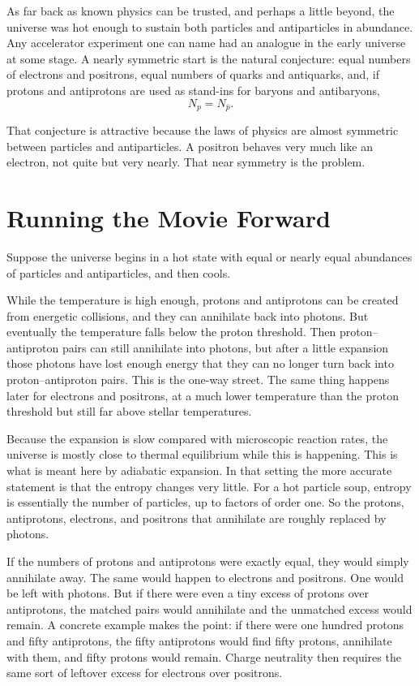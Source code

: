 As far back as known physics can be trusted, and perhaps a little beyond, the universe was hot enough to sustain both particles and antiparticles in abundance. Any accelerator experiment one can name had an analogue in the early universe at some stage. A nearly symmetric start is the natural conjecture: equal numbers of electrons and positrons, equal numbers of quarks and antiquarks, and, if protons and antiprotons are used as stand-ins for baryons and antibaryons,
\[
N_p = N_{\bar p}.
\]

That conjecture is attractive because the laws of physics are almost symmetric between particles and antiparticles. A positron behaves very much like an electron, not quite but very nearly. That near symmetry is the problem.

\section{Running the Movie Forward}

Suppose the universe begins in a hot state with equal or nearly equal abundances of particles and antiparticles, and then cools.

While the temperature is high enough, protons and antiprotons can be created from energetic collisions, and they can annihilate back into photons. But eventually the temperature falls below the proton threshold. Then proton--antiproton pairs can still annihilate into photons, but after a little expansion those photons have lost enough energy that they can no longer turn back into proton--antiproton pairs. This is the one-way street. The same thing happens later for electrons and positrons, at a much lower temperature than the proton threshold but still far above stellar temperatures.

Because the expansion is slow compared with microscopic reaction rates, the universe is mostly close to thermal equilibrium while this is happening. This is what is meant here by adiabatic expansion. In that setting the more accurate statement is that the entropy changes very little. For a hot particle soup, entropy is essentially the number of particles, up to factors of order one. So the protons, antiprotons, electrons, and positrons that annihilate are roughly replaced by photons.

If the numbers of protons and antiprotons were exactly equal, they would simply annihilate away. The same would happen to electrons and positrons. One would be left with photons. But if there were even a tiny excess of protons over antiprotons, the matched pairs would annihilate and the unmatched excess would remain. A concrete example makes the point: if there were one hundred protons and fifty antiprotons, the fifty antiprotons would find fifty protons, annihilate with them, and fifty protons would remain. Charge neutrality then requires the same sort of leftover excess for electrons over positrons.

